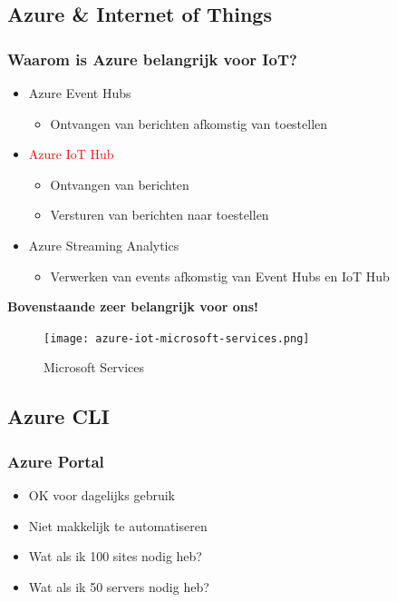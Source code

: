 \documentclass{article}
\newcommand{\bold}[1]{\textbf{#1}}
\begin{document}
\subsection{Azure \& Internet of Things}

\subsubsection{Waarom is Azure belangrijk voor IoT?}

\begin{itemize}
    \item Azure Event Hubs
    \begin{itemize}
        \item Ontvangen van berichten afkomstig van toestellen
    \end{itemize}
    \item \textcolor{red}{Azure IoT Hub}
    \begin{itemize}
        \item Ontvangen van berichten
        \item Versturen van berichten naar toestellen
    \end{itemize}
    \item Azure Streaming Analytics
    \begin{itemize}
        \item Verwerken van events afkomstig van Event Hubs en IoT Hub
    \end{itemize}
\end{itemize}

\bold{Bovenstaande zeer belangrijk voor ons!}

\begin{figure}[H]
    \centering
    \texttt{[image: azure-iot-microsoft-services.png]}
    \caption{Microsoft Services}
\end{figure}

\subsection{Azure CLI}

\subsubsection{Azure Portal}

\begin{itemize}
    \item OK voor dagelijks gebruik
    \item Niet makkelijk te automatiseren
    \item Wat als ik 100 sites nodig heb?
    \item Wat als ik 50 servers nodig heb?
\end{itemize}
\end{document}
